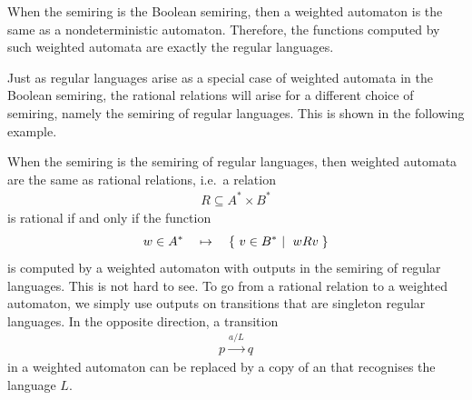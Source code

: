 \begin{myexample}
    When the semiring is the Boolean semiring, then a weighted automaton is the same as a nondeterministic automaton. Therefore, the functions computed by such weighted automata are exactly the regular languages.
\end{myexample}

Just as regular languages arise as a special case of weighted automata in the Boolean semiring, the rational relations will arise for a different choice of semiring, namely the semiring of regular languages. This is shown in the following example.

\begin{myexample}\label{ex:weighted-automata-semiring-regular-languages}
    When the semiring is the semiring of regular languages, then weighted automata are the same as rational relations, i.e.~a relation
    \begin{align*}
    R \subseteq A^* \times B^*
    \end{align*} 
    is rational if and only if the function 
    \begin{align*}
    w \in A^* \quad \mapsto \quad \setbuild{ v \in B^*}{$wRv$}
    \end{align*}
    is computed by a weighted automaton with outputs in the semiring of regular languages. This is not hard to see. To go from a rational relation to a weighted automaton, we simply use outputs on transitions that are singleton regular languages. In the opposite direction, a transition 
    \begin{align*}
      p \xrightarrow {a / L} q
    \end{align*}
    in a weighted automaton can be replaced by a copy of an \nfa that recognises the language $L$. 
\end{myexample}


